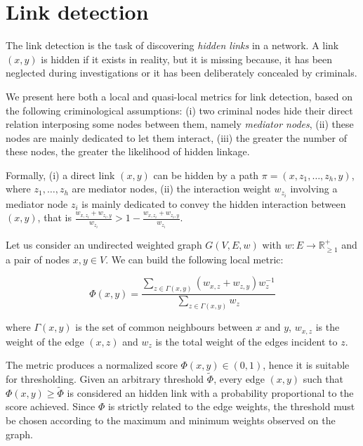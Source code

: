 \section{Link detection}
\label{sec:link-detection}

The link detection is the task of discovering \textit{hidden links} in a network. 
A link $(x,y)$ is hidden if it exists in reality, but it is missing because, it has been neglected during investigations or it has been deliberately concealed by criminals.

We present here both a local and quasi-local metrics for link detection, based on the following criminological assumptions: 
(i) two criminal nodes hide their direct relation interposing some nodes between them, namely \textit{mediator nodes}, 
(ii) these nodes are mainly dedicated to let them interact,
(iii) the greater the number of these nodes, the greater the likelihood of hidden linkage. 

Formally, 
(i) a direct link $(x,y)$ can be hidden by a path $\pi=(x,z_{1},\ldots,z_{h},y)$, where $z_{1},\ldots,z_{h}$ are mediator nodes,
(ii) the interaction weight $w_{z_{i}}$ involving a mediator node $z_{i}$ is mainly dedicated to convey the hidden interaction between $(x,y)$, that is $\frac{w_{x,z_{i}}+w_{z_{i},y}}{w_{z_{i}}} > 1- \frac{w_{x,z_{i}}+w_{z_{i},y}}{w_{z_{i}}}$.

Let us consider an undirected weighted graph $G(V,E,w)$ with $w:E\rightarrow\mathbb{R}_{\geq1}^{+}$ and a pair of nodes $x,y\in V$.
We can build the following local metric:

\begin{equation}
\label{eqn:detection-local}
\Phi(x,y)=
\frac{\sum\limits_{z\in\Gamma(x,y)}(w_{x,z}+w_{z,y})w_{z}^{-1}}
{\sum\limits_{z\in\Gamma(x,y)}w_{z}}
\end{equation}

where 
$\Gamma(x,y)$ is the set of common neighbours between $x$ and $y$,
$w_{x,z}$ is the weight of the edge $(x,z)$ and
$w_{z}$ is the total weight of the edges incident to $z$.

The metric produces a normalized score $\Phi(x,y)\in(0,1)$, hence it is suitable for thresholding.
Given an arbitrary threshold $\tilde{\Phi}$, every edge $(x,y)$ such that $\Phi(x,y)\geq\tilde{\Phi}$ is considered an hidden link with a probability proportional to the score achieved.
Since $\Phi$ is strictly related to the edge weights, the threshold must be chosen according to the maximum and minimum weights observed on the graph. 

